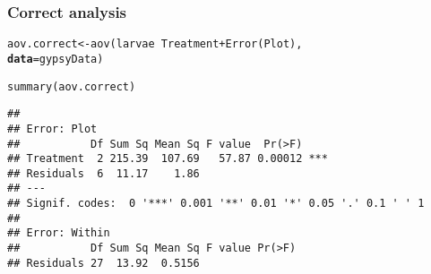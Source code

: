 \documentclass[color=usenames,dvipsnames]{beamer}\usepackage[]{graphicx}\usepackage[]{color}
\makeatletter
\newcommand{\hlopt}[1]{\textcolor[rgb]{0,0,0}{#1}}%
\newcommand{\hlstd}[1]{\textcolor[rgb]{0,0,0}{#1}}%
\newcommand{\hlkwb}[1]{\textcolor[rgb]{0,0.341,0.682}{#1}}%
\newcommand{\hlkwc}[1]{\textcolor[rgb]{0,0,0}{\textbf{#1}}}%
\newcommand{\hlkwd}[1]{\textcolor[rgb]{0.004,0.004,0.506}{#1}}%
\newenvironment{kframe}{%
 \def\at@end@of@kframe{}%
 \ifinner\ifhmode%
  \def\at@end@of@kframe{\end{minipage}}%
  \begin{minipage}{\columnwidth}%
 \fi\fi%
 \def\FrameCommand##1{\hskip\@totalleftmargin \hskip-\fboxsep
 \colorbox{shadecolor}{##1}\hskip-\fboxsep
     \hskip-\linewidth \hskip-\@totalleftmargin \hskip\columnwidth}%
 \MakeFramed {\advance\hsize-\width
   \@totalleftmargin\z@ \linewidth\hsize
   \@setminipage}}%
 {\par\unskip\endMakeFramed%
 \at@end@of@kframe}
\newenvironment{knitrout}{}{} %
\makeatother
\begin{document}
\begin{frame}[fragile]
  \frametitle{Correct analysis}
\begin{knitrout}\scriptsize
{}\color{fgcolor}\begin{kframe}
\begin{alltt}
\hlstd{aov.correct} \hlkwb{<-} \hlkwd{aov}\hlstd{(larvae} \hlopt{~} \hlstd{Treatment} \hlopt{+} \hlkwd{Error}\hlstd{(Plot),}
                   \hlkwc{data}\hlstd{=gypsyData)}
\end{alltt}
\end{kframe}
\end{knitrout}
\pause
\begin{knitrout}\scriptsize
{}\color{fgcolor}\begin{kframe}
\begin{alltt}
\hlkwd{summary}\hlstd{(aov.correct)}
\end{alltt}
\begin{verbatim}
## 
## Error: Plot
##           Df Sum Sq Mean Sq F value  Pr(>F)    
## Treatment  2 215.39  107.69   57.87 0.00012 ***
## Residuals  6  11.17    1.86                    
## ---
## Signif. codes:  0 '***' 0.001 '**' 0.01 '*' 0.05 '.' 0.1 ' ' 1
## 
## Error: Within
##           Df Sum Sq Mean Sq F value Pr(>F)
## Residuals 27  13.92  0.5156
\end{verbatim}
\end{kframe}
\end{knitrout}
\end{frame}
\end{document}
